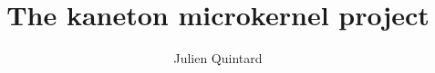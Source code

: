 
%
%



%
%


%
%

\title{The kaneton microkernel project}

%
%

\author{\small{Julien Quintard}}

%
%



%
%

\maketitle

%
%

